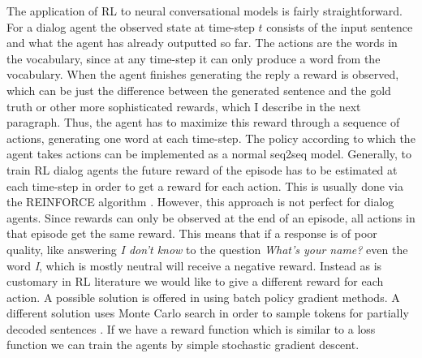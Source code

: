 \documentclass[12pt]{article}
\begin{document}
The application of RL to neural conversational models is fairly straightforward. For a dialog agent the observed state at time-step \(t\) consists of the input sentence and what the agent has already outputted so far. The actions are the words in the vocabulary, since at any time-step it can only produce a word from the vocabulary. When the agent finishes generating the reply a reward is observed, which can be just the difference between the generated sentence and the gold truth or other more sophisticated rewards, which I describe in the next paragraph. Thus, the agent has to maximize this reward through a sequence of actions, generating one word at each time-step. The policy according to which the agent takes actions can be implemented as a normal seq2seq model. Generally, to train RL dialog agents the future reward of the episode has to be estimated at each time-step in order to get a reward for each action. This is usually done via the REINFORCE algorithm \cite{Williams:1992}. However, this approach is not perfect for dialog agents. Since rewards can only be observed at the end of an episode, all actions in that episode get the same reward. This means that if a response is of poor quality, like answering \textit{I don't know} to the question \textit{What's your name?} even the word \textit{I}, which is mostly neutral will receive a negative reward.  Instead as is customary in RL literature we would like to give a different reward for each action. A possible solution is offered in \cite{Kandasamy:2017} using batch policy gradient methods. A different solution uses Monte Carlo search in order to sample tokens for partially decoded sentences \cite{Li_adversarial:2017}. If we have a reward function which is similar to a loss function we can train the agents by simple stochastic gradient descent.
\end{document}
